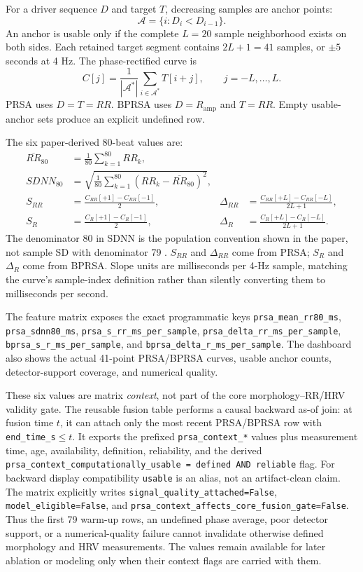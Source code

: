\documentclass[11pt,a4paper]{article}
\begin{document}
For a driver sequence $D$ and target $T$, decreasing samples are anchor points:
\[
\mathcal{A}=\{i:D_i<D_{i-1}\}.
\]
An anchor is usable only if the complete $L=20$ sample neighborhood exists on
both sides. Each retained target segment contains $2L+1=41$ samples, or
$\pm5$ seconds at 4 Hz. The phase-rectified curve is
\[
C[j]=\frac{1}{|\mathcal{A}^{*}|}
\sum_{i\in\mathcal{A}^{*}}T[i+j],
\qquad j=-L,\ldots,L.
\]
PRSA uses $D=T=RR$. BPRSA uses $D=R_{\mathrm{amp}}$ and $T=RR$. Empty
usable-anchor sets produce an explicit undefined row.

The six paper-derived 80-beat values are:
\begin{align}
\overline{RR}_{80} &= \frac{1}{80}\sum_{k=1}^{80}RR_k,\\
SDNN_{80} &= \sqrt{\frac{1}{80}\sum_{k=1}^{80}
  (RR_k-\overline{RR}_{80})^2},\\
S_{RR} &= \frac{C_{RR}[+1]-C_{RR}[-1]}{2},&
\Delta_{RR} &= \frac{C_{RR}[+L]-C_{RR}[-L]}{2L+1},\\
S_R &= \frac{C_R[+1]-C_R[-1]}{2},&
\Delta_R &= \frac{C_R[+L]-C_R[-L]}{2L+1}.
\end{align}
The denominator $80$ in SDNN is the population convention shown in the
paper, not sample SD with denominator 79 \cite{varon2015}. $S_{RR}$ and
$\Delta_{RR}$ come from PRSA; $S_R$ and $\Delta_R$ come from BPRSA. Slope
units are milliseconds per 4-Hz sample, matching the curve's sample-index
definition rather than silently converting them to milliseconds per second.

The feature matrix exposes the exact programmatic keys
\texttt{prsa\_mean\_rr80\_ms}, \texttt{prsa\_sdnn80\_ms},
\texttt{prsa\_s\_rr\_ms\_per\_sample},
\texttt{prsa\_delta\_rr\_ms\_per\_sample},
\texttt{bprsa\_s\_r\_ms\_per\_sample}, and
\texttt{bprsa\_delta\_r\_ms\_per\_sample}. The dashboard also shows the
actual 41-point PRSA/BPRSA curves, usable anchor counts, detector-support
coverage, and numerical quality.

These six values are matrix \emph{context}, not part of the core
morphology--RR/HRV validity gate. The reusable fusion table performs a causal
backward as-of join: at fusion time $t$, it can attach only the most recent
PRSA/BPRSA row with \texttt{end\_time\_s}$\leq t$. It exports the prefixed
\texttt{prsa\_context\_*} values plus measurement time, age, availability,
definition, reliability, and the derived
\texttt{prsa\_context\_computationally\_usable = defined AND reliable} flag.
For backward display compatibility \texttt{usable} is an alias, not an
artifact-clean claim. The matrix explicitly writes
\texttt{signal\_quality\_attached=False},
\texttt{model\_eligible=False}, and
\texttt{prsa\_context\_affects\_core\_fusion\_gate=False}. Thus the first 79
warm-up rows, an undefined phase average, poor detector support, or a
numerical-quality failure cannot invalidate otherwise defined morphology and
HRV measurements. The values remain available for later ablation or modeling
only when their context flags are carried with them.
\end{document}
